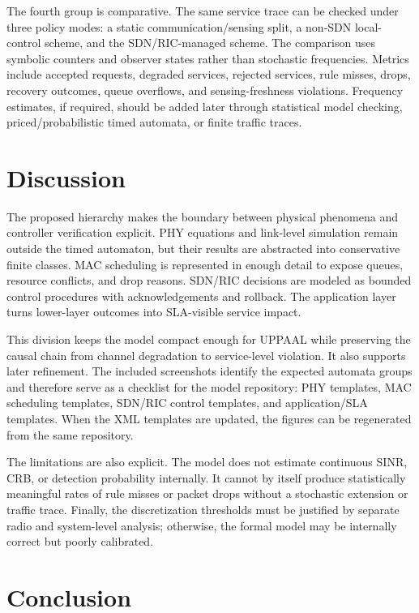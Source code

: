 \documentclass[runningheads]{llncs}
\begin{document}
The fourth group is comparative. The same service trace can be checked under three policy modes: a static communication/sensing split, a non-SDN local-control scheme, and the SDN/RIC-managed scheme. The comparison uses symbolic counters and observer states rather than stochastic frequencies. Metrics include accepted requests, degraded services, rejected services, rule misses, drops, recovery outcomes, queue overflows, and sensing-freshness violations. Frequency estimates, if required, should be added later through statistical model checking, priced/probabilistic timed automata, or finite traffic traces.

\section{Discussion}

The proposed hierarchy makes the boundary between physical phenomena and controller verification explicit. PHY equations and link-level simulation remain outside the timed automaton, but their results are abstracted into conservative finite classes. MAC scheduling is represented in enough detail to expose queues, resource conflicts, and drop reasons. SDN/RIC decisions are modeled as bounded control procedures with acknowledgements and rollback. The application layer turns lower-layer outcomes into SLA-visible service impact.

This division keeps the model compact enough for UPPAAL while preserving the causal chain from channel degradation to service-level violation. It also supports later refinement. The included screenshots identify the expected automata groups and therefore serve as a checklist for the model repository: PHY templates, MAC scheduling templates, SDN/RIC control templates, and application/SLA templates. When the XML templates are updated, the figures can be regenerated from the same repository.

The limitations are also explicit. The model does not estimate continuous SINR, CRB, or detection probability internally. It cannot by itself produce statistically meaningful rates of rule misses or packet drops without a stochastic extension or traffic trace. Finally, the discretization thresholds must be justified by separate radio and system-level analysis; otherwise, the formal model may be internally correct but poorly calibrated.

\section{Conclusion}
\end{document}
